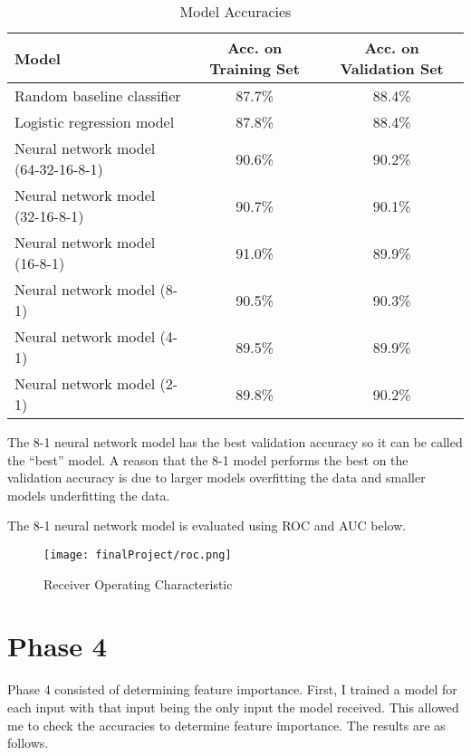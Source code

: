 \documentclass{article}
\begin{document}
\begin{table}[H]
\centering
\begin{tabular}{|l|c|c|}
\hline
Model & Acc. on Training Set & Acc. on Validation Set \\
\hline
Random baseline classifier & 87.7\% & 88.4\% \\
Logistic regression model & 87.8\% & 88.4\% \\
Neural network model (64-32-16-8-1) & 90.6\% & 90.2\% \\
Neural network model (32-16-8-1) & 90.7\% & 90.1\% \\
Neural network model (16-8-1) & 91.0\% & 89.9\% \\
Neural network model (8-1) & 90.5\% & 90.3\% \\
Neural network model (4-1) & 89.5\% & 89.9\% \\
Neural network model (2-1) & 89.8\% & 90.2\% \\
\hline
\end{tabular}
\caption{Model Accuracies}
\label{tab:my_label}
\end{table}

The 8-1 neural network model has the best validation accuracy so it can be called the “best” model. A reason that the 8-1 model performs the best on the validation accuracy is due to larger models overfitting the data and smaller models underfitting the data.

The 8-1 neural network model is evaluated using ROC and AUC below.

\begin{figure}[H]
\centering
\texttt{[image: finalProject/roc.png]}
\caption{Receiver Operating Characteristic}
\label{fig:my_label}
\end{figure}

\section{Phase 4}

Phase 4 consisted of determining feature importance. First, I trained a model for each input with that input being the only input the model received. This allowed me to check the accuracies to determine feature importance. The results are as follows. 
\end{document}
